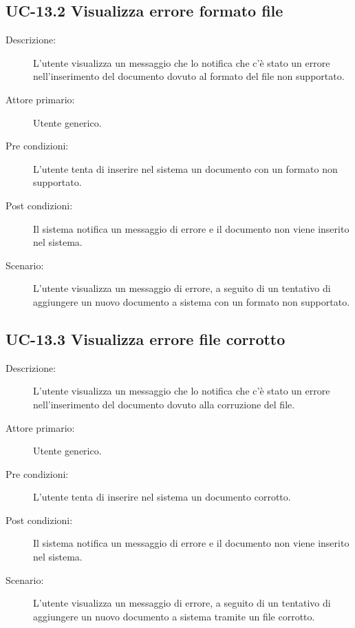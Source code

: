 \subsection{UC-13.2 Visualizza errore formato file}
\begin{description}
    \item[Descrizione:] L'utente visualizza un messaggio che lo notifica che c'è stato un errore nell'inserimento del documento dovuto al formato del file non supportato.
    \item[Attore primario:] Utente generico.
    \item[Pre condizioni:] L'utente tenta di inserire nel sistema un documento con un formato non supportato.
    \item[Post condizioni:] Il sistema notifica un messaggio di errore e il documento non viene inserito nel sistema.
    \item[Scenario:] L'utente visualizza un messaggio di errore, a seguito di un tentativo di aggiungere un nuovo documento a sistema con un formato non supportato.
\end{description}

\subsection{UC-13.3 Visualizza errore file corrotto}
\begin{description}
    \item[Descrizione:] L'utente visualizza un messaggio che lo notifica che c'è stato un errore nell'inserimento del documento dovuto alla corruzione del file.
    \item[Attore primario:] Utente generico.
    \item[Pre condizioni:] L'utente tenta di inserire nel sistema un documento corrotto.
    \item[Post condizioni:] Il sistema notifica un messaggio di errore e il documento non viene inserito nel sistema.
    \item[Scenario:] L'utente visualizza un messaggio di errore, a seguito di un tentativo di aggiungere un nuovo documento a sistema tramite un file corrotto.
\end{description}

